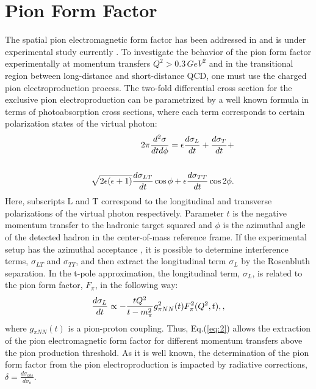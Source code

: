 \documentclass[3p,times,twocolumn]{revtex4}
\begin{document}
\section{Pion Form Factor}

The spatial pion electromagnetic form factor has been
addressed in \cite{Ga84,NR,JK,FC,IBG,MT} and is 
under experimental study currently \cite{Fpi}. 
To investigate the behavior of the pion form factor experimentally at  momentum transfers $Q^{2}>0.3\, GeV^{2}$ 
and in the transitional region between long-distance and short-distance QCD, one must use the
charged pion electroproduction process. The two-fold differential
cross section for the exclusive pion electroproduction can be parametrized
by a well known formula \cite{EP1} in terms of photoabsorption
cross sections, where each term corresponds to certain polarization
states of the virtual photon:
\begin{eqnarray}
&&2\pi\frac{d^{2}\sigma}{dtd\phi}=\epsilon\frac{d\sigma_{L}}{dt}+
\frac{d\sigma_{T}}{dt}+ \nonumber \\ \nonumber \\
&&\sqrt{2\epsilon(\epsilon+1)} \frac{d\sigma_{LT}}{dt}\cos\phi 
+\epsilon\frac{d\sigma_{TT}}{dt}\cos2\phi \space . \label{eq:1}
\end{eqnarray}
Here, subscripts L and T correspond to the longitudinal and transverse
polarizations of the virtual photon respectively. Parameter $t$ is
the negative momentum transfer to the hadronic target squared and $\phi$
is the azimuthal angle of the detected hadron in the center-of-mass reference
frame. If the experimental setup has the azimuthal acceptance
\cite{Fpi}, it is possible to determine interference terms, $\sigma_{LT}$
and $\sigma_{TT}$, and then extract the longitudinal term $\sigma_{L}$
by the Rosenbluth separation. In the t-pole approximation, the longitudinal
term, $\sigma_{L}$, is related to the pion form factor, $F{}_{\pi}$,
in the following way:
\begin{eqnarray}
\frac{d\sigma_{L}}{dt}\propto-\frac{tQ^{2}}{t-m_{\pi}^{2}}g_{\pi NN}^{2}(t)F_{\pi}^{2}(Q^{2},t),\label{eq:2} \space ,
\end{eqnarray}
where $g{}_{\pi NN}(t)$ is a pion-proton coupling. Thus, Eq.(\ref{eq:2}) allows the extraction of the pion electromagnetic form factor
for different momentum transfers above the pion production threshold. As it is well known, the determination of the pion form factor from the pion electroproduction is impacted by radiative corrections,  $\delta=\frac{d\sigma_{obs}}{d\sigma_{o}}$.
\end{document}
